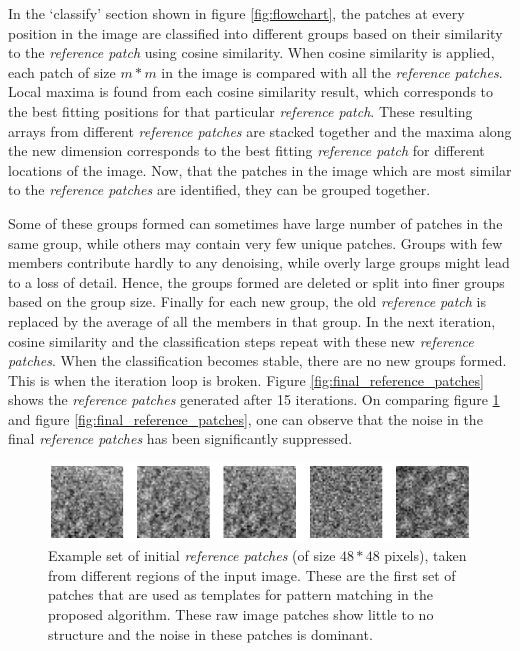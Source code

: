 \documentclass[fleqn,10pt]{wlscirep}
\begin{document}
	
	In the `classify' section shown in figure \ref{fig:flowchart}, the patches at every position in the image are classified into different groups based on their similarity to the \textit{reference patch} using cosine similarity. When cosine similarity is applied, each patch of size $m*m$ in the image is compared with all the \textit{reference patches}. Local maxima is found from each cosine similarity result, which corresponds to the best fitting positions for that particular \textit{reference patch}. These resulting arrays from different \textit{reference patches} are stacked together and the maxima along the new dimension corresponds to the best fitting \textit{reference patch} for different locations of the image. Now, that the patches in the image which are most similar to the \textit{reference patches} are identified, they can be grouped together.
	
	Some of these groups formed can sometimes have large number of patches in the same group, while others may contain very few unique patches. Groups with few members contribute hardly to any denoising, while overly large groups might lead to a loss of detail. Hence, the groups formed are deleted or split into finer groups based on the group size. Finally for each new group, the old \textit{reference patch} is replaced by the average of all the members in that group. In the next iteration, cosine similarity and the classification steps repeat with these new \textit{reference patches}. When the classification becomes stable, there are no new groups formed. This is when the iteration loop is broken. Figure \ref{fig:final_reference_patches} shows the \textit{reference patches} generated after 15 iterations. On comparing figure \ref{fig:initial_reference_patches} and figure \ref{fig:final_reference_patches}, one can observe that the noise in the final \textit{reference patches} has been significantly suppressed.

	\begin{figure}
		\centering
		\includegraphics[scale=0.85]{./imgs/initial_reference_patches.png}
		\caption{Example set of initial \textit{reference patches} (of size $48*48$ pixels), taken from different regions of the input image. These are the first set of patches that are used as templates for pattern matching in the proposed algorithm. These raw image patches show little to no structure and the noise in these patches is dominant. }
		\label{fig:initial_reference_patches}
	\end{figure} 
	
\end{document}
